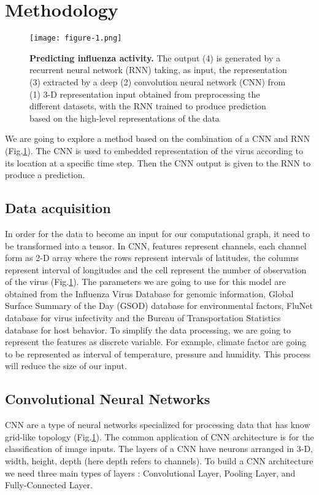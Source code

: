 \documentclass[12pt]{article}
\begin{document}
\section{Methodology}

\begin{figure}[h]
    \centering
    \texttt{[image: figure-1.png]}
    \caption{\textbf{Predicting influenza activity.}  The output (4) is generated by a recurrent neural network (RNN) taking, as input, the representation  (3)  extracted by a deep (2) convolution neural network (CNN) from  (1) 3-D representation input obtained from preprocessing the different datasets, with the RNN trained to produce prediction based on the high-level representations of the data}
    \label{fig:model}
\end{figure}

We are going to explore a method based on the combination of a CNN and RNN (Fig.\ref{fig:model}). The CNN is used to embedded representation of the virus according to its location at a specific time step. Then the CNN output is given to the RNN to produce a prediction. 


\subsection{Data acquisition}
 In order for the data to become an input for our computational graph, it need to be transformed into a tensor. In CNN, features represent channels, each channel form as 2-D array where the rows represent intervals of latitudes, the columns represent interval of longitudes and the cell represent the number of observation of the virus (Fig.\ref{fig:model}). The parameters we are going to use for this model are obtained from the Influenza Virus Database\autocite{chang2006influenza} for genomic information, Global Surface Summary of the Day (GSOD)\autocite{Lott1998} database for environmental factors, FluNet database\autocite{flahault1998} for virus infectivity and the Bureau of Transportation Statistics database\autocite{mcdonald2013} for host behavior. To simplify the data processing, we are going to represent the features as discrete variable. For example, climate factor are going to be represented as interval of temperature, pressure and humidity. This process will reduce the size of our input.
 
\subsection{Convolutional Neural Networks}
CNN are a type of neural networks specialized for processing data  that has know grid-like topology (Fig.\ref{fig:model}). The common application of CNN architecture is for the classification of image inputs. The layers of a CNN have neurons arranged in 3-D, width, height, depth (here depth refers to channels). To build a CNN architecture we need three main types of layers : Convolutional Layer, Pooling Layer, and Fully-Connected Layer.
\end{document}
